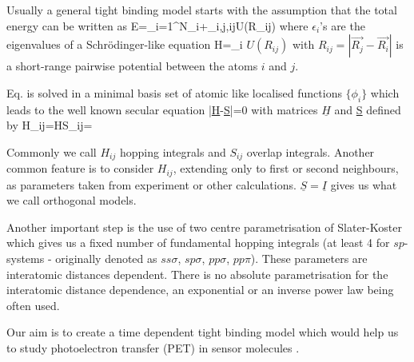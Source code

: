 \par{Usually a general tight binding model starts with the assumption that the
total energy can be written as}
\be
E=\sum_{i=1}^{N}\epsilon_i+\sum_{i,j,i\neq j}U(R_{ij})
\ee
where $\epsilon_i$'s are the eigenvalues of a Schr{\"o}dinger-like equation
\be
\label{eigenschro}
H=\epsilon_i
\ee
$U(R_{ij})$ with $R_{ij}=|\vec{R_j}-\vec{R_i}|$ is a short-range pairwise
potential between the atoms $i$ and $j$.
\par{Eq.  is solved in a minimal basis set of atomic like
localised functions $\{\phi_i\}$ which leads to the well known secular equation}
\be
|\underline{H}-\epsilon \underline{S}|=0
\ee
with matrices $\underline{H}$ and {\underline{S}} defined by
\be
H_{ij}=H\quad\quad S_{ij}=
\ee
\par{Commonly we call $H_{ij}$ hopping integrals and $S_{ij}$ overlap
integrals. Another common feature is to consider $H_{ij}$, extending only to
first or second neighbours, as parameters taken from experiment or other
calculations. $\underline{S}=\underline{I}$ gives us what we call orthogonal
models.}
\par{Another important step is the use of two centre parametrisation of
Slater-Koster which gives us a fixed number of fundamental hopping integrals
(at least 4 for $sp$-systems - originally denoted as $ss\sigma$, $sp\sigma$,
$pp\sigma$, $pp\pi$). These parameters are interatomic
distances dependent. There is no absolute parametrisation for the interatomic distance
dependence, an exponential or an inverse power law being often used.}
\par{Our aim is to create a time dependent tight binding model which would help us to study
photoelectron transfer (PET) in sensor molecules \citep{deSilva01b}.}
